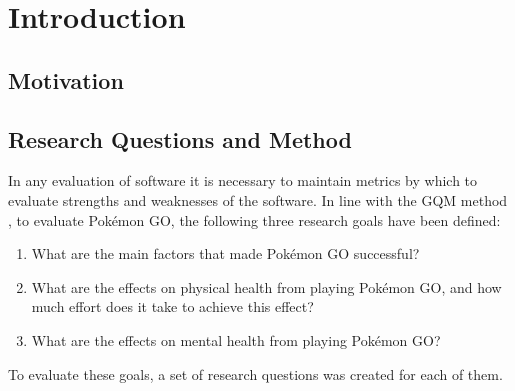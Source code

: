 
\chapter{Introduction}

\label{Chapter1}

\section{Motivation}


\section{Research Questions and Method}


In any evaluation of software it is necessary to maintain metrics by which to evaluate strengths and weaknesses of the software. In line with the GQM method , to evaluate Pokémon GO, the following three research goals have been defined:

\begin{enumerate}
	\item What are the main factors that made Pokémon GO successful?
	\item What are the effects on physical health from playing Pokémon GO, and how much effort does it take to achieve this effect?
	\item What are the effects on mental health from playing Pokémon GO?
\end{enumerate}

To evaluate these goals, a set of research questions was created for each of them.



